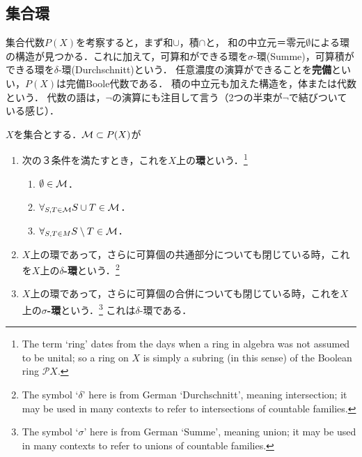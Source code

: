 \documentclass[uplatex, dvipdfmx]{jsreport}
\begin{document}
\subsection{集合環}

\begin{tcolorbox}[colframe=ForestGreen, colback=ForestGreen!10!white,breakable,colbacktitle=ForestGreen!40!white,coltitle=black,fonttitle=\bfseries\sffamily,
title=]
    集合代数$P(X)$を考察すると，まず和$\cup$，積$\cap$と，
    和の中立元＝零元$\emptyset$による環の構造が見つかる．これに加えて，可算和ができる環を$\sigma$-環(Summe)，可算積ができる環を$\delta$-環(Durchschnitt)という．
    任意濃度の演算ができることを\textbf{完備}といい，$P(X)$は完備Boole代数である．
    積の中立元も加えた構造を，体または代数という．
    代数の語は，$\lnot$の演算にも注目して言う（2つの半束が$\lnot$で結びついている感じ）．
\end{tcolorbox}

\begin{definition}
    $X$を集合とする．$\mathcal{M}\subset P(X)$が
    \begin{enumerate}
        \item 次の３条件を満たすとき，これを$X$上の\textbf{環}という．\footnote{The term ‘ring’ dates from the days when a ring in algebra was not assumed to be unital; so a ring on $X$ is simply a subring (in this sense) of the Boolean ring $\mathcal{P} X$.}
        \begin{enumerate}[1]
            \item $\emptyset\in\mathcal{M}$．
            \item $\forall_{S,T\in\mathcal{M}}S\cup T\in\mathcal{M}$．
            \item $\forall_{S,T\in M}S\setminus T\in\mathcal{M}$．
        \end{enumerate}
        \item $X$上の環であって，さらに可算個の共通部分についても閉じている時，これを$X$上の\textbf{$\delta$-環}という．\footnote{The symbol ‘$\delta$’ here is from German ‘Durchschnitt’, meaning intersection; it may be used in many contexts to refer to intersections of countable families.}
        \item $X$上の環であって，さらに可算個の合併についても閉じている時，これを$X$上の\textbf{$\sigma$-環}という．\footnote{The symbol ‘$\sigma$’ here is from German ‘Summe’, meaning union; it may be used in many contexts to refer to unions of countable families.}
        これは$\delta$-環である．
    \end{enumerate}
\end{definition}
\end{document}
